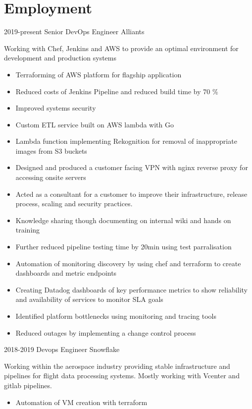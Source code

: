 \documentclass[]{friggeri-cv-a4}
\begin{document}
\section{Employment}
 \begin{entrylist}
  \entry
  	{2019-present}
  	{Senior DevOps Engineer}
  	{Alliants}
  	{Working with Chef, Jenkins and AWS to provide an optimal environment for development and production systems
      \begin{itemize}
        \item Terraforming of AWS platform for flagship application
        \item Reduced costs of Jenkins Pipeline and reduced build time by 70 \%
        \item Improved systems security
        \item Custom ETL service built on AWS lambda with Go
        \item Lambda function implementing Rekognition for removal of inappropriate images from S3 buckets
        \item Designed and produced a customer facing VPN with nginx reverse proxy for accessing onsite servers
        \item Acted as a consultant for a customer to improve their infrastructure, release process, scaling and security practices. 
        \item Knowledge sharing though documenting on internal wiki and hands on training
        \item Further reduced pipeline testing time by 20min using test parralisation
        \item Automation of monitoring discovery by using chef and terraform to create dashboards and metric endpoints
        \item Creating Datadog dashboards of key performance metrics to show reliability and availability of services to monitor SLA goals
        \item Identified platform bottlenecks using monitoring and tracing tools
        \item Reduced outages by implementing a change control process
      \end{itemize}}
  \entry 
  	{2018-2019}
  	{Devops Engineer}
  	{Snowflake}
  	{
      Working within the aerospace industry providing stable infrastructure and pipelines for flight data processing systems. Mostly working with Vcenter and gitlab pipelines.
      \begin{itemize}
        \item Automation of VM creation with terraform

\end{itemize}}
\end{entrylist}
\end{document}
